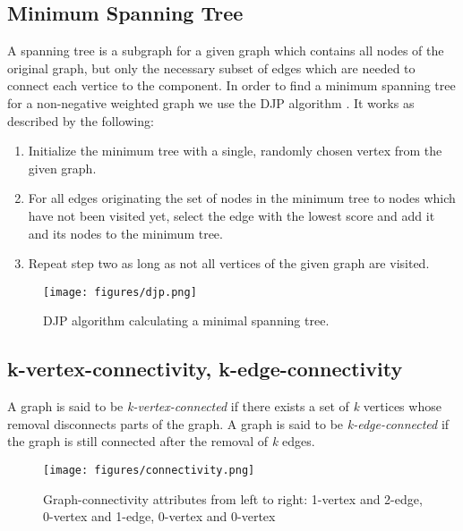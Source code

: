   \subsection{Minimum Spanning Tree}
    A spanning tree is a subgraph for a given graph which contains all nodes of the original graph, but only the necessary subset of edges which are needed to connect each vertice
    to the component. In order to find a minimum spanning tree for a non-negative weighted graph we use the DJP algorithm \cite{prim}\cite{jarnik}.
    It works as described by the following:
    
    \begin{enumerate}
     \item Initialize the minimum tree with a single, randomly chosen vertex from the given graph.
     
     \item For all edges originating the set of nodes in the minimum tree to nodes which have not been visited yet, select the edge with the lowest score and add it and its nodes 
      to the minimum tree.
      
     \item Repeat step two as long as not all vertices of the given graph are visited.
    \end{enumerate}
    
    \begin{figure}[th!]
      \centering
      \texttt{[image: figures/djp.png]}
      \caption{DJP algorithm calculating a minimal spanning tree.}
      \label{fig:djp}
    \end{figure}
    
  \subsection{k-vertex-connectivity, k-edge-connectivity}
    A graph is said to be \textit{k-vertex-connected} if there exists a set of \textit{k} vertices whose removal disconnects parts of the graph.\newline
    A graph is said to be \textit{k-edge-connected} if the graph is still connected after the removal of \textit{k} edges.
    
    \begin{figure}[th!]
      \centering
      \texttt{[image: figures/connectivity.png]}
      \caption{Graph-connectivity attributes from left to right: 1-vertex and 2-edge, 0-vertex and 1-edge, 0-vertex and 0-vertex}
      \label{fig:connectivity}
    \end{figure}
    
